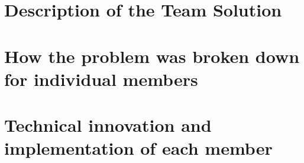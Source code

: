 \section{Description of the Team Solution}
\section{How the problem was broken down for individual members}
\section{Technical innovation and implementation of each member}
